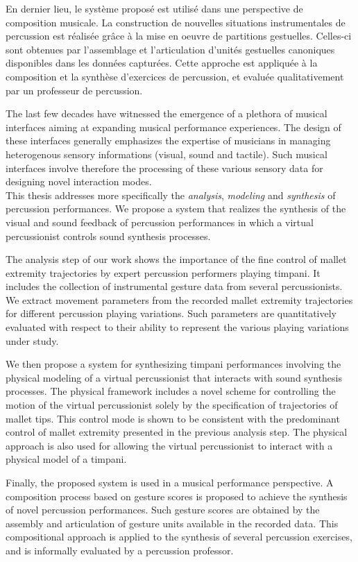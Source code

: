 \documentclass[twoside, a4paper, 12pt]{book}
\begin{document}
{En dernier lieu, le syst{\`e}me propos{\'e} est utilis{\'e} dans une perspective de composition musicale. La construction de nouvelles situations instrumentales de percussion est r{\'e}alis{\'e}e gr{\^a}ce {\`a} la mise en oeuvre de partitions gestuelles. Celles-ci sont obtenues par l'assemblage et l'articulation d'unit{\'e}s gestuelles canoniques disponibles dans les donn{\'e}es captur{\'e}es. Cette approche est appliqu{\'e}e {\`a} la composition et la synth{\`e}se d'exercices de percussion, et evalu{\'e}e qualitativement par un professeur de percussion.\\
}{
	The last few decades have witnessed the emergence of a plethora of musical interfaces aiming at expanding musical performance experiences. The design of these interfaces generally emphasizes the expertise of musicians in managing heterogenous sensory informations (visual, sound and tactile). Such musical interfaces involve therefore the processing of these various sensory data for designing novel interaction modes.\\

This thesis addresses more specifically the \emph{analysis}, \emph{modeling} and \emph{synthesis} of percussion performances. We propose a system that realizes the synthesis of the visual and sound feedback of percussion performances in which a virtual percussionist controls sound synthesis processes.

The analysis step of our work shows the importance of the fine control of mallet extremity trajectories by expert percussion performers playing timpani. It includes the collection of instrumental gesture data from several percussionists. We extract movement parameters from the recorded mallet extremity trajectories for different percussion playing variations. Such parameters are quantitatively evaluated with respect to their ability to represent the various playing variations under study.

We then propose a system for synthesizing timpani performances involving the physical modeling of a virtual percussionist that interacts with sound synthesis processes. The physical framework includes a novel scheme for controlling the motion of the virtual percussionist solely by the specification of trajectories of mallet tips. This control mode is shown to be consistent with the predominant control of mallet extremity presented in the previous analysis step. The physical approach is also used for allowing the virtual percussionist to interact with a physical model of a timpani.

Finally, the proposed system is used in a musical performance perspective. A composition process based on gesture scores is proposed to achieve the synthesis of novel percussion performances. Such gesture scores are obtained by the assembly and articulation of gesture units available in the recorded data. This compositional approach is applied to the synthesis of several percussion exercises, and is informally evaluated by a percussion professor.\\
}
\makeAbstracts
\newpage\vfill~\newpage
\end{document}
